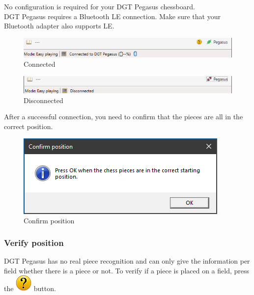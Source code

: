 \documentclass[11pt,a4paper]{article}
\begin{document}
No configuration is required for your DGT Pegasus chessboard.\\
DGT Pegasus requires a Bluetooth LE connection. Make sure that your Bluetooth adapter also supports LE.

\begin{figure}[H]
	\centering
	\includegraphics[scale=0.8]{Pegasus2.png}
	\caption{Connected}
	\label{fig:Pegasus2}
\end{figure}

\begin{figure}[H]
	\centering
	\includegraphics[scale=0.8]{Pegasus3.png}
	\caption{Disconnected}
	\label{fig:Pegasus3}
\end{figure}

After a successful connection, you need to confirm that the pieces are all in the correct position.

\begin{figure}[H]
	\centering
	\includegraphics[scale=0.8]{Pegasus4.png}
	\caption{Confirm position}
	\label{fig:Pegasus4}
\end{figure}

\subsubsection{Verify position} \label{VerifyPegasusPosition}
DGT Pegasus has no real piece recognition and can only give the information per field whether there is a piece or not. To verify if a piece is placed on a field, press the  \includegraphics[scale=0.4]{emotion_question.png} button.
\end{document}
